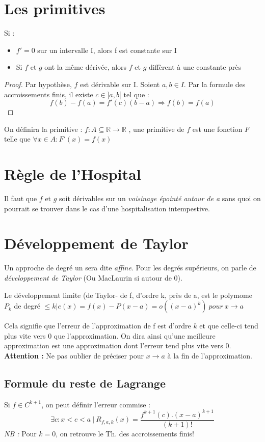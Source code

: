 \documentclass	[11pt, a4paper, openany]{book}
\begin{document}
\section{Les primitives}
Si : 
\begin{itemize}
\item $f' = 0$ sur un intervalle I, alors f est constante sur I
\item Si $f$ et $g$ ont la même dérivée, alors $f$ et $g$ diffèrent à une constante près
\end{itemize}
\begin{proof}
Par hypothèse, $f$ est dérivable sur I. Soient $a, b \in I$. Par la formule des accroissements finis, il existe $c \in ]a, b[$ tel que :
$$f(b) - f(a) = f'(c)(b-a) \Rightarrow f(b) = f(a)$$
\end{proof}
On définira la primitive : $f:A \subseteq \mathbb{R} \rightarrow \mathbb{R}$ , une primitive de $f$ est une fonction $F$ telle que $\forall x \in A : F'(x) = f(x)$

\section{Règle de l'Hospital}
Il faut que $f$ et $g$ soit dérivables sur un \textit{voisinage épointé autour de a} sans quoi on pourrait se trouver dans le cas d'une hospitalisation intempestive.

\section{Développement de Taylor}
Un approche de degré un sera dite \textit{affine}. Pour les degrés supérieurs, on parle de \textit{développement de Taylor} (Ou MacLaurin si autour de 0).
\begin{center}
Le développement limite (de Taylor- de f, d'ordre k, près de a, est le polymome $P_{k}$ de degré $\leq k | e(x) = f(x) - P(x-a) = o((x-a)^{k})\ pour\ x \rightarrow a$
\end{center}
Cela signifie que l'erreur de l'approximation de f est d'ordre $k$ et que celle-ci tend plus vite vers 0 que l'approximation. On dira ainsi qu'une meilleure approximation est une approximation dont l'erreur tend plus vite vers 0.\\
\textbf{Attention :} Ne pas oublier de préciser pour $x \rightarrow a$ à la fin de l'approximation.

\subsection{Formule du reste de Lagrange}
Si $f \in C^{k+1}$, on peut définir l'erreur commise :
$$\exists c : x < c < a\ |\ R_{f, a, k}(x) = \frac{f^{k+1}(c) . (x-a)^{k+1}}{(k+1)!}$$
\textit{NB : } Pour $k=0$, on retrouve le Th. des accroissements finis!\\\\
\end{document}
